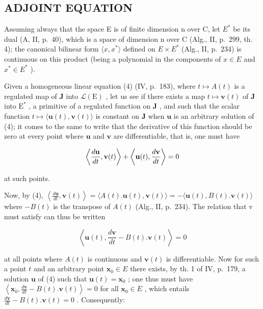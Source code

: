 \subsection{ADJOINT EQUATION}

Assuming always that the space E is of finite dimension n over C, let \(E^{*}\) be its dual (A, II, p.~40), which is a space of dimension n over C (Alg., II, p.~299, th. 4); the canonical bilinear form \(\langle x, x^{*}\rangle\) defined on \(E \times E^{*}\) (Alg., II, p.~234) is continuous on this product (being a polynomial in the components of \(x \in E\) and \(x^{*} \in E^{*}\) ).

Given a homogeneous linear equation (4) (IV, p.~183), where \(t \mapsto A(t)\) is a regulated map of \(\mathbf{J}\) into \(\mathcal{L}(\mathrm{E})\) , let us see if there exists a map \(t \mapsto \mathbf{v}(t)\) of \(\mathbf{J}\) into \(\mathrm{E}^*\) , a primitive of a regulated function on \(\mathbf{J}\) , and such that the scalar function \(t \mapsto \langle \mathbf{u}(t), \mathbf{v}(t) \rangle\) is constant on \(\mathbf{J}\) when \(\mathbf{u}\) is an arbitrary solution of (4); it comes to the same to write that the derivative of this function should be zero at every point where \(\mathbf{u}\) and \(\mathbf{v}\) are differentiable, that is, one must have

\[
\left\langle \frac {d {\bf u}}{d t}, {\bf v} (t) \right\rangle + \left\langle {\bf u} (t), \frac {d {\bf v}}{d t} \right\rangle = 0
\]

at such points.

Now, by (4), \(\left\langle\frac{d\mathbf{u}}{dt},\mathbf{v}(t)\right\rangle=\langle A(t).\mathbf{u}(t),\mathbf{v}(t)\rangle=-\langle\mathbf{u}(t),B(t).\mathbf{v}(t)\rangle\) where \(-B(t)\) is the transpose of \(A(t)\) (Alg., II, p.~234). The relation that v must satisfy can thus be written

\[
\left\langle \mathbf {u} (t), \frac {d \mathbf {v}}{d t} - B (t). \mathbf {v} (t) \right\rangle = 0
\]

at all points where \(A(t)\) is continuous and \(\mathbf{v}(t)\) is differentiable. Now for such a point \(t\) and an arbitrary point \(\mathbf{x}_0 \in E\) there exists, by th. 1 of IV, p.~179, a solution \(\mathbf{u}\) of (4) such that \(\mathbf{u}(t) = \mathbf{x}_0\) ; one thus must have \(\left\langle \mathbf{x}_0, \frac{d\mathbf{v}}{dt} - B(t).\mathbf{v}(t) \right\rangle = 0\) for all \(\mathbf{x}_0 \in E\) , which entails \(\frac{d\mathbf{v}}{dt} - B(t).\mathbf{v}(t) = 0\) . Consequently:

